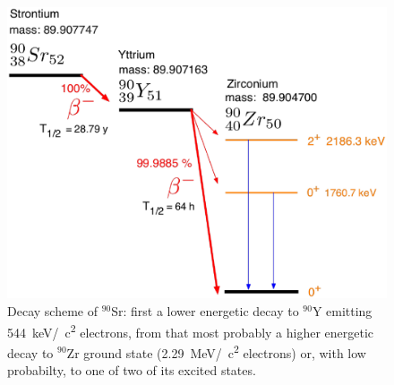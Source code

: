   \begin{figure}
  \centering
  	\includegraphics[width = 0.5 \textwidth]{graphics/cobalt/Sr90_decay.eps}
  	\caption[Cobalt decay scheme]{Decay scheme of $^{90}$Sr: first a lower energetic decay to $^{90}$Y emitting \SI{544}{\kilo\electronvolt}/\SI{}{\square c} electrons, from that most probably a higher energetic decay to $^{90}$Zr ground state (\SI{2.29}{\mega\electronvolt}/\SI{}{\square c} electrons) or, with low probabilty, to one of two of its excited states.}
  \end{figure}

